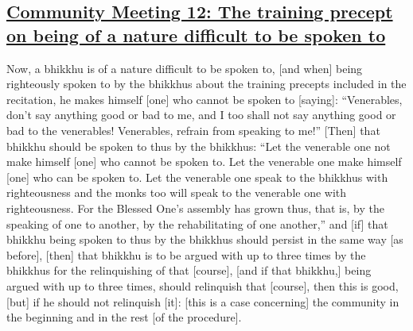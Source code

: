 \subsection*{\hyperref[sd12]{Community Meeting 12: The training precept on being of a nature difficult to be spoken to}}
\label{comm12}

Now, a bhikkhu is of a nature difficult to be spoken to, [and when] being righteously spoken to by the bhikkhus about the training precepts included in the recitation, he makes himself [one] who cannot be spoken to [saying]: ``Venerables, don't say anything good or bad to me, and I too shall not say anything good or bad to the venerables! Venerables, refrain from speaking to me!'' [Then] that bhikkhu should be spoken to thus by the bhikkhus: ``Let the venerable one not make himself [one] who cannot be spoken to. Let the venerable one make himself [one] who can be spoken to. Let the venerable one speak to the bhikkhus with righteousness and the monks too will speak to the venerable one with righteousness. For the Blessed One's assembly has grown thus, that is, by the speaking of one to another, by the rehabilitating of one another,'' and [if] that bhikkhu being spoken to thus by the bhikkhus should persist in the same way [as before], [then] that bhikkhu is to be argued with up to three times by the bhikkhus for the relinquishing of that [course], [and if that bhikkhu,] being argued with up to three times, should relinquish that [course], then this is good, [but] if he should not relinquish [it]: [this is a case concerning] the community in the beginning and in the rest [of the procedure].



